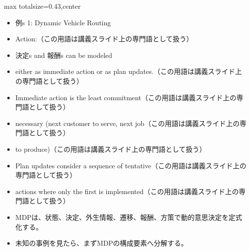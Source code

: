 \clearpage
{}
\begin{minipage}[t]{0.405\textwidth}
\begin{adjustbox}{max totalsize={\textwidth}{0.43\textheight},center}
\begin{minipage}{\textwidth}\scriptsize
{}\begin{itemize}
\item 例s 1: Dynamic Vehicle Routing
\item Action:（この用語は講義スライド上の専門語として扱う）
\item 決定s and 報酬s can be modeled
\item either as immediate action or as plan updates.（この用語は講義スライド上の専門語として扱う）
\item Immediate action is the least commitment（この用語は講義スライド上の専門語として扱う）
\item necessary (next customer to serve, next job（この用語は講義スライド上の専門語として扱う）
\item to produce)（この用語は講義スライド上の専門語として扱う）
\item Plan updates consider a sequence of tentative（この用語は講義スライド上の専門語として扱う）
\item actions where only the first is implemented（この用語は講義スライド上の専門語として扱う）
\end{itemize}\begin{itemize}
\item MDPは、状態、決定、外生情報、遷移、報酬、方策で動的意思決定を定式化する。
\item 未知の事例を見たら、まずMDPの構成要素へ分解する。
\end{itemize}
\end{minipage}
\end{adjustbox}
\end{minipage}\hfill
